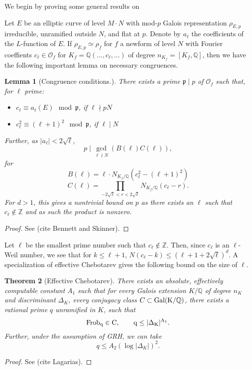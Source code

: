 \documentclass[12pt]{amsart}
\newtheorem{thm}{Theorem}[section]
\newtheorem{lem}[thm]{Lemma}
\theoremstyle{definition}
\def\O{{\mathcal O}}
\def\Q{{\mathbb Q}}
\newcommand{\Frob}{\rm Frob}
\newcommand{\Gal}{\rm Gal}
\begin{document}
We begin by proving some general results on 

Let $E$ be an elliptic curve of level $M \cdot N$ with mod-$p$ Galois representation $\rho_{E,p}$ irreducible, unramified outside $N$, and flat at $p$.  Denote by $a_\ell$ the coefficients of the $L$-function of $E$.  If $\rho_{E,p} \simeq \rho_f$ for $f$ a newform of level $N$ with Fourier coeffients $c_\ell\in \O_f$ for $K_f = \Q(...,c_\ell,...)$ of degree $n_{K_f} = [K_f,\mathbb{Q}]$, then we have the following important lemma on necessary congruences.

\begin{lem}[Congruence conditions.]\label{ircong1}
There exists a prime $\mathfrak{p} \mid p$ of $\mathcal{O}_f$ such that, for $\ell$ prime:
\begin{itemize}
\item $c_\ell \equiv a_\ell(E) \mod \mathfrak{p}$, if $\ell \nmid pN$
\item $c_\ell^2 \equiv (\ell+1)^2 \mod \mathfrak{p}$, if $\ell \mid N$
\end{itemize}
Further, as $|a_\ell| < 2\sqrt{\ell}$,
\[p \mid \gcd_{\ell \nmid N}(B(\ell)C(\ell)), \] for
\[B(\ell) = \ell \cdot N_{K_f / \mathbb{Q}}(c_\ell^2-(\ell+1)^2) \]
\[C(\ell) = \prod_{-2\sqrt{\ell} < r < 2\sqrt{\ell}}{N_{K_f / \mathbb{Q}}}(c_\ell - r).\]
For $d > 1$, this gives a nontrivial bound on $p$ as there exists an $\ell$ such that $c_\ell \notin \mathbb{Z}$ and as such the product is nonzero.
\end{lem}

\begin{proof}
See (cite Bennett and Skinner).
\end{proof}

Let $\ell$ be the smallest prime number such that $c_\ell \notin \mathbb{Z}$. Then, since $c_\ell$ is an $\ell$-Weil number, we see that for $k \leq \ell+1$, $N(c_\ell - k) \leq (\ell+1 + 2\sqrt{\ell})^d$.  A specialization of effective Chebotarev gives the following bound on the size of $\ell$.

\begin{thm}[Effective Chebotarev]\label{effcheb}
There exists an absolute, effectively computable constant $A_1$ such that for every Galois extension $K/\mathbb{Q}$ of degree $n_K$ and discriminant $\Delta_K$, every conjugacy class $C \subset \Gal(K/\mathbb{Q})$, there exists a rational prime $q$ unramified in $K$, such that 
\[\Frob_q \in C, \qquad q \leq |\Delta_K|^{A_1}. \]  
Further, under the assumption of GRH, we can take \[q \leq A_2 (\log |\Delta_K|)^2. \]
\end{thm}
\begin{proof}
See (cite Lagarias).
\end{proof}
\end{document}
